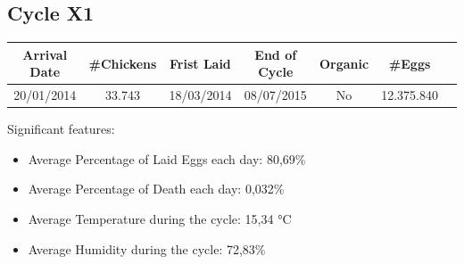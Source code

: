\documentclass[11pt]{article}
\begin{document}
\subsection{Cycle X1}
\begin{center}
    \begin{tabular}{| c | c | c | c | c | c | c |}
        \hline
        \textbf{Arrival Date} & \textbf{\#Chickens} & \textbf{Frist Laid} & \textbf{End of Cycle} & \textbf{Organic} & \textbf{\#Eggs}     \\ [0.5ex]
        \hline
        20/01/2014   & 33.743     & 18/03/2014 & 08/07/2015   & No      & 12.375.840 \\
        \hline
    \end{tabular}
\end{center}

Significant features:
\begin{itemize}
    \item Average Percentage of Laid Eggs each day: 80,69\%
    \item Average Percentage of Death each day: 0,032\%
    \item Average Temperature during the cycle: 15,34 °C
    \item Average Humidity during the cycle: 72,83\%
\end{itemize}
\end{document}
